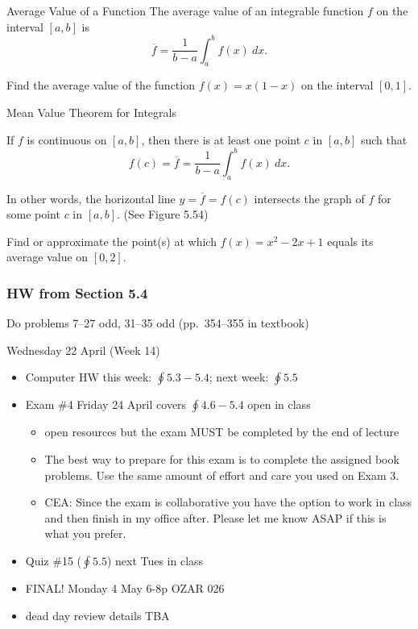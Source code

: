 \documentclass[14pt]{beamer}
\newcommand{\dint}{\displaystyle\int}
\begin{document}
\begin{frame}{\small Average Value of a Function}
\small
The average value of an integrable function $f$ on the interval $[a,b]$ is 
\[\overline{f}=\frac{1}{b-a} \dint_a^b f(x)\ dx.\]

\begin{exe} Find the average value of the function $f(x)=x(1-x)$ on the interval $[0,1]$. \end{exe}
\end{frame}

\begin{frame}{\small Mean Value Theorem for Integrals}
\small
\begin{thm} If $f$ is continuous on $[a,b]$, then there is at least one point $c$ in $[a,b]$ such that 
\[f(c)=\overline{f}=\frac{1}{b-a} \dint_a^b f(x)\ dx.\]
\end{thm}

\bigskip

In other words, the horizontal line $y=\overline{f}=f(c)$ intersects the graph of $f$ for some point $c$ in $[a,b]$. (See Figure 5.54)
\end{frame}

\begin{frame}%
\small
\begin{exe} Find or approximate the point(s) at which $f(x)=x^2-2x+1$ equals its average value on $[0,2]$. \end{exe}
\end{frame}

\begin{frame}
\frametitle{HW from Section 5.4}
Do problems 7--27 odd, 31--35 odd (pp.\ 354--355 in textbook)
\end{frame}


\begin{frame}{Wednesday 22 April (Week 14)}
\footnotesize
\begin{itemize}
\item Computer HW this week: $\oint 5.3-5.4$; next week: $\oint 5.5$
\item Exam \#4 Friday 24 April covers $\oint 4.6-5.4$ open in class
	\begin{itemize}
	\footnotesize
	\item open resources but the exam MUST be completed by the end of lecture
	\item The best way to prepare for this exam is to complete the assigned book problems.  Use the same amount of effort and care you used on Exam 3.
	\item CEA: Since the exam is collaborative you have the option to work in class and then finish in my office after.  Please let me know ASAP if this is what you prefer.
	\end{itemize}
\item Quiz \#15 ($\oint 5.5$) next Tues in class
\item FINAL! Monday 4 May 6-8p OZAR 026
\item dead day review details TBA
\end{itemize}
\end{frame}
\end{document}

